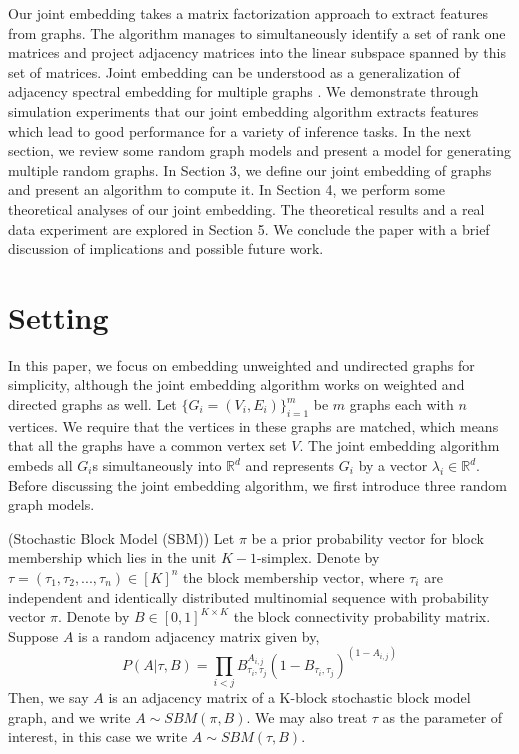 \documentclass[10pt,journal,compsoc]{IEEEtran}
\newenvironment{definition}[1][Definition]{\begin{trivlist}
		\item[\hskip \labelsep {\bfseries #1}]}{\end{trivlist}}
\begin{document}
\noindent Our joint embedding takes a matrix factorization approach to extract features from graphs. The algorithm manages to simultaneously identify a set of rank one matrices and project adjacency matrices into the linear subspace spanned by this set of matrices. Joint embedding can be understood as a generalization of adjacency spectral embedding for multiple graphs \cite{sussman2012consistent}. We demonstrate through simulation experiments that our joint embedding algorithm extracts features which lead to good performance for a variety of inference tasks. In the next section, we review some random graph models and present a model for generating multiple random graphs. In Section 3, we define our joint embedding of graphs and present an algorithm to compute it. In Section 4, we perform some theoretical analyses of our joint embedding. The theoretical results and a real data experiment are explored in Section 5. We conclude the paper with a brief discussion of implications and possible future work.

\section{Setting}
In this paper, we focus on embedding unweighted and undirected graphs for simplicity, although the joint embedding algorithm works on weighted and directed graphs as well. Let $\{G_i=(V_i,E_i)\} _{i=1}^{m}$ be $m$ graphs each with $n$ vertices. We require that the vertices in these graphs are matched, which means that all the graphs have a common vertex set $V$. The joint embedding algorithm embeds all $G_i$s simultaneously into $\mathbb{R}^d$ and represents $G_i$  by a vector $\lambda_i \in \mathbb{R}^d$. Before discussing the joint embedding algorithm, we first introduce three random graph models.

\begin{definition} (Stochastic Block Model (SBM)) Let $\pi$ be a prior probability vector for block membership which lies in the unit $K-1$-simplex. Denote by $\tau=(\tau_1,\tau_2,...,\tau_n) \in [K]^n$ the block membership vector, where $\tau_i$ are independent and identically distributed multinomial sequence with probability vector $\pi$.
Denote by $B \in [0,1]^{K \times K}$ the block connectivity probability matrix. Suppose $A$ is a random adjacency matrix given by,
\[ P(A|\tau,B)= \prod_{i<j} B_{\tau_i,\tau_j}^{A_{i,j}} (1-B_{\tau_i,\tau_j})^{(1-A_{i,j})}\] 
Then, we say $A$ is an adjacency matrix of a K-block stochastic block model graph, and we write $A \sim SBM(\pi,B)$. We may also treat $\tau$ as the parameter of interest, in this case we write $A \sim SBM(\tau,B)$.
\end{definition}
\end{document}
